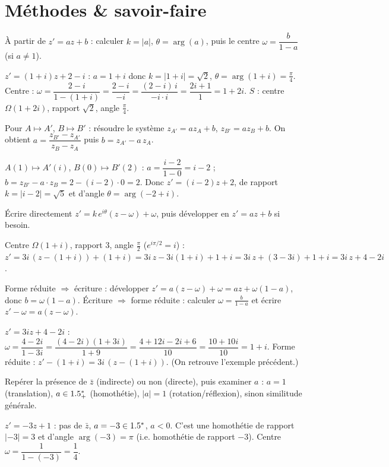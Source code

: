 \section{Méthodes \& savoir-faire}

À partir de $z'=az+b$ : calculer $k=|a|$, $\theta=\arg(a)$, puis le centre $\omega=\dfrac{b}{1-a}$ (si $a\neq1$).
\begin{exemple}
$z'=(1+i)z+2-i$ : $a=1+i$ donc $k=|1+i|=\sqrt2$, $\theta=\arg(1+i)=\frac\pi4$. Centre :
$\omega=\dfrac{2-i}{1-(1+i)}=\dfrac{2-i}{-i}=\dfrac{(2-i)\,i}{-i\cdot i}=\dfrac{2i+1}{1}=1+2i$.
$S$ : centre $\Omega(1+2i)$, rapport $\sqrt2$, angle $\frac\pi4$.
\end{exemple}

Pour $A\mapsto A'$, $B\mapsto B'$ : résoudre le système $z_{A'}=az_A+b$, $z_{B'}=az_B+b$. On obtient
$a=\dfrac{z_{B'}-z_{A'}}{z_B-z_A}$ puis $b=z_{A'}-a\,z_A$.
\begin{exemple}
$A(1)\mapsto A'(i)$, $B(0)\mapsto B'(2)$ : $a=\dfrac{i-2}{1-0}=i-2$ ; $b=z_{B'}-a\cdot z_B=2-(i-2)\cdot0=2$.
Donc $z'=(i-2)z+2$, de rapport $k=|i-2|=\sqrt5$ et d'angle $\theta=\arg(-2+i)$.
\end{exemple}

Écrire directement $z'=k\,e^{i\theta}(z-\omega)+\omega$, puis développer en $z'=az+b$ si besoin.
\begin{exemple}
Centre $\Omega(1+i)$, rapport $3$, angle $\frac\pi2$ ($e^{i\pi/2}=i$) :
$z'=3i\,(z-(1+i))+(1+i)=3i\,z-3i(1+i)+1+i=3i\,z+(3-3i)+1+i=3i\,z+4-2i$.
\end{exemple}

Forme réduite $\Rightarrow$ écriture : développer $z'=a(z-\omega)+\omega=az+\omega(1-a)$, donc $b=\omega(1-a)$.
Écriture $\Rightarrow$ forme réduite : calculer $\omega=\frac{b}{1-a}$ et écrire $z'-\omega=a(z-\omega)$.
\begin{exemple}
$z'=3iz+4-2i$ : $\omega=\dfrac{4-2i}{1-3i}=\dfrac{(4-2i)(1+3i)}{1+9}=\dfrac{4+12i-2i+6}{10}=\dfrac{10+10i}{10}=1+i$.
Forme réduite : $z'-(1+i)=3i\,(z-(1+i))$. (On retrouve l'exemple précédent.)
\end{exemple}

Repérer la présence de $\bar z$ (indirecte) ou non (directe), puis examiner $a$ : $a=1$ (translation),
$a\in1.5_+^*$ (homothétie), $|a|=1$ (rotation/réflexion), sinon similitude générale.
\begin{exemple}
$z'=-3z+1$ : pas de $\bar z$, $a=-3\in1.5^*$, $a<0$. C'est une homothétie de rapport $|{-3}|=3$ et d'angle
$\arg(-3)=\pi$ (i.e. homothétie de rapport $-3$). Centre $\omega=\dfrac{1}{1-(-3)}=\dfrac14$.
\end{exemple}

